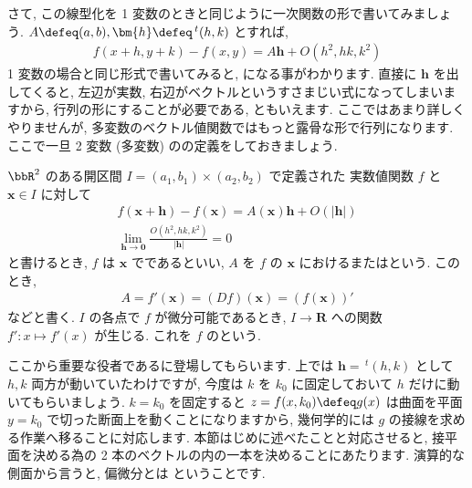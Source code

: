 \documentclass[openany, a4paper, oneside]{jsbook}
\begin{document}
さて, この線型化を 1 変数のときと同じように一次関数の形で書いてみましょう.
 $A\defeq(a,b),\bm{h}\defeq\,^t (h,k)$ とすれば,
\begin{align}
    f (x+h,y+k) - f (x,y)
    =
    A \bm{h} + O (h^2,h k,k^2)
\end{align}
1 変数の場合と同じ形式で書いてみると, になる事がわかります.
直接に $\bm{h}$ を出してくると, 左辺が実数, 右辺がベクトルというすさまじい式になってしまいますから, 行列の形にすることが必要である, ともいえます.
ここではあまり詳しくやりませんが, 多変数のベクトル値関数ではもっと露骨な形で行列になります.
ここで一旦 2 変数 (多変数) のの定義をしておきましょう.
    \begin{defn} $\bbR^2$ のある開区間 $I=(a_1,b_1)\times (a_2,b_2)$ で定義された
実数値関数 $f$ と $\bm{x} \in I$ に対して
\begin{gather}
    f (\bm{x}+\bm{h}) - f (\bm{x}) = A (\bm{x})\bm{h} + O\left ( |\bm{h}| \right) \\
    \lim_{\bm{h} \to \bm{0}}\frac{O (h^2,h k,k^2 )}{|\bm{h}|}=0
\end{gather}
と書けるとき,  $f$ は $\bm{x}$ でであるといい,
 $A$ を $f$ の $\bm{x}$ におけるまたはという.
このとき,
   \begin{align} A=f'(\bm{x})=(Df) (\bm{x})=\left ( f (\bm{x}) \right) '
   \end{align}
などと書く.  $I$ の各点で $f$ が微分可能であるとき,  $I \to \bm{R}$ への関数
$f':x \mapsto f'(x)$ が生じる. これを $f$ のという.
\end{defn}

ここから重要な役者であるに登場してもらいます.
上では $\bm{h}=\,^t (h,k)$ として $h,k$ 両方が動いていたわけですが, 今度は $k$ を $k_0$ に固定しておいて $h$ だけに動いてもらいましょう.
 $k=k_0$ を固定すると $z=f (x,k_0)\defeq g (x)$ は曲面を平面 $y=k_0$ で切った断面上を動くことになりますから,
幾何学的には $g$ の接線を求める作業へ移ることに対応します.
本節はじめに述べたことと対応させると, 接平面を決める為の 2 本のベクトルの内の一本を決めることにあたります.
演算的な側面から言うと, 偏微分とは
ということです.
\end{document}
